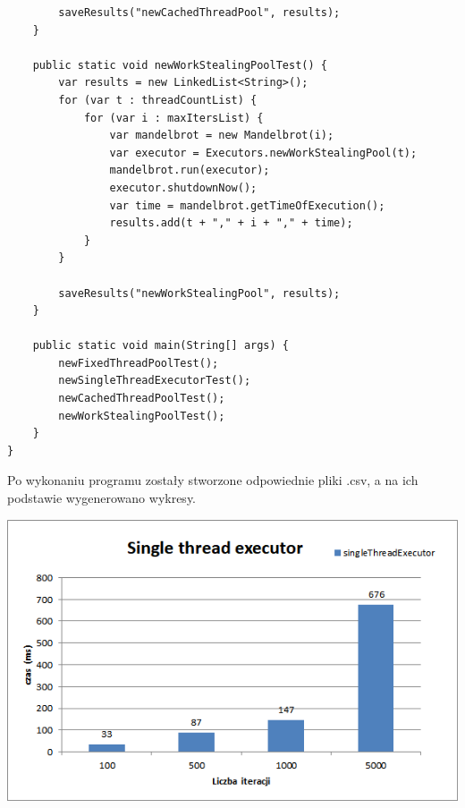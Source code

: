 \documentclass[12pt]{article}
\begin{document}
\begin{verbatim}
        saveResults("newCachedThreadPool", results);
    }

    public static void newWorkStealingPoolTest() {
        var results = new LinkedList<String>();
        for (var t : threadCountList) {
            for (var i : maxItersList) {
                var mandelbrot = new Mandelbrot(i);
                var executor = Executors.newWorkStealingPool(t);
                mandelbrot.run(executor);
                executor.shutdownNow();
                var time = mandelbrot.getTimeOfExecution();
                results.add(t + "," + i + "," + time);
            }
        }

        saveResults("newWorkStealingPool", results);
    }

    public static void main(String[] args) {
        newFixedThreadPoolTest();
        newSingleThreadExecutorTest();
        newCachedThreadPoolTest();
        newWorkStealingPoolTest();
    }
}
\end{verbatim}

\noindent
Po wykonaniu programu zostały stworzone odpowiednie pliki .csv, a na ich podstawie wygenerowano wykresy.

\begin{center}
\centering
    \includegraphics{s1.png}
\end{center}
\end{document}
